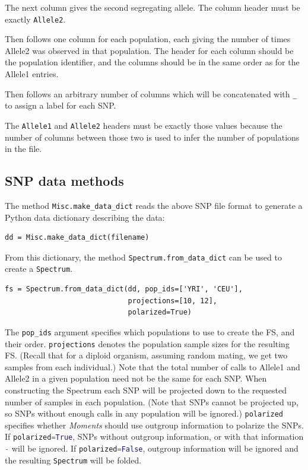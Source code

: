 \documentclass[12pt]{article}
\makeatletter
\newcommand{\py}[1]{\lstinline[breaklines=true,language=Python, showstringspaces=False]@#1@}
\makeatother
\begin{document}
The next column gives the second segregating allele.
The column header must be exactly \py{Allele2}.

Then follows one column for each population, each giving the number of times Allele2 was observed in that population.
The header for each column should be the population identifier, and the columns should be in the same order as for the Allele1 entries.

Then follows an arbitrary number of columns which will be concatenated with \py{_} to assign a label for each SNP.

The \py{Allele1} and \py{Allele2} headers must be exactly those values because the number of columns between those two is used to infer the number of populations in the file.

\subsection{SNP data methods}

The method \py{Misc.make_data_dict} reads the above SNP file format to generate a Python data dictionary describing the data:
\begin{lstlisting}
dd = Misc.make_data_dict(filename)
\end{lstlisting}
From this dictionary, the method \py{Spectrum.from_data_dict} can be used to create a \py{Spectrum}.
\begin{lstlisting}
fs = Spectrum.from_data_dict(dd, pop_ids=['YRI', 'CEU'],
                             projections=[10, 12],
                             polarized=True)
\end{lstlisting}
The \py{pop_ids} argument specifies which populations to use to create the FS, and their order.
\py{projections} denotes the population sample sizes for the resulting FS.
(Recall that for a diploid organism, assuming random mating, we get two samples from each individual.)
Note that the total number of calls to Allele1 and Allele2 in a given population need not be the same for each SNP.
When constructing the Spectrum each SNP will be projected down to the requested number of samples in each population.
(Note that SNPs cannot be projected up, so SNPs without enough calls in any population will be ignored.)
\py{polarized} specifies whether \textit{Moments} should use outgroup information to polarize the SNPs.
If \py{polarized=True}, SNPs without outgroup information, or with that information \py{-} will be ignored.
If \py{polarized=False}, outgroup information will be ignored and the resulting \py{Spectrum} will be folded.
\end{document}

